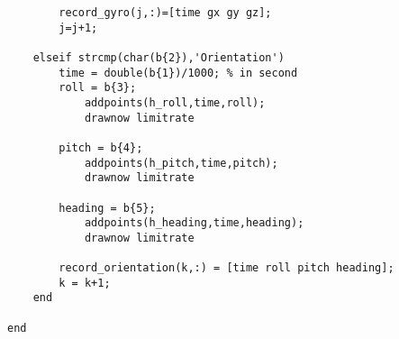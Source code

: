 \begin{lstlisting}
        record_gyro(j,:)=[time gx gy gz];
        j=j+1;
        
    elseif strcmp(char(b{2}),'Orientation')
        time = double(b{1})/1000; % in second
        roll = b{3};
            addpoints(h_roll,time,roll);
            drawnow limitrate
            
        pitch = b{4};
            addpoints(h_pitch,time,pitch);
            drawnow limitrate
            
        heading = b{5};
            addpoints(h_heading,time,heading);
            drawnow limitrate
            
        record_orientation(k,:) = [time roll pitch heading];
        k = k+1;
    end 

end 
\end{lstlisting} 
\newpage    
